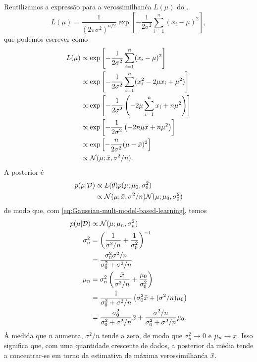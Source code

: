 \begin{solution}
    Reutilizamos a express\~ao para a verossimilhan\'ca $L(\mu)$ do .
    \begin{equation}
        L(\mu) = \frac{1}{(2\pi\sigma^2)^{n/2}}\exp\left[-\frac{1}{2\sigma^2}\sum_{i=1}^n (x_i-\mu)^2\right],
    \end{equation}
    que podemos escrever como
    \begin{align}
        L(\mu) & \propto \exp\left[-\frac{1}{2\sigma^2}\sum_{i=1}^n (x_i-\mu)^2\right]\\
        & \propto  \exp\left[-\frac{1}{2\sigma^2}\sum_{i=1}^n (x_i^2-2\mu x_i + \mu^2)\right]\\
        & \propto  \exp\left[-\frac{1}{2\sigma^2}\left( -2 \mu \sum_{i=1}^n x_i + n \mu^2 \right)\right]\\
        & \propto  \exp\left[-\frac{1}{2\sigma^2}\left( -2n \mu \bar{x} + n \mu^2 \right)\right]\\
        & \propto  \exp\left[-\frac{n}{2\sigma^2}(\mu-\bar{x})^2 \right]\\
        & \propto  \mathcal{N}(\mu ; \bar{x}, \sigma^2/n).
    \end{align}
    A posterior \'e
    \begin{align}
        p(\mu | \mathcal{D}) & \propto L(\theta) p(\mu; \mu_0, \sigma_0^2)\\
        & \propto  \mathcal{N}(\mu ; \bar{x}, \sigma^2/n)  \mathcal{N}(\mu ; \mu_0, \sigma_0^2)
    \end{align}
    de modo que, com \eqref{eq:Gaussian-mult-model-based-learning}, temos
    \begin{align}
        p(\mu | \mathcal{D}) & \propto \mathcal{N}(\mu ; \mu_n, \sigma_n^2)\\
        \sigma^2_n & =  \left( \frac{1}{\sigma^2/n} + \frac{1}{\sigma_0^2}\right)^{-1} \\
        & =  \frac{ \sigma_0^2 \sigma^2/n}{\sigma_0^2+\sigma^2/n}\\
        \mu_n & =  \sigma_n^2\left( \frac{\bar{x}}{\sigma^2/n}+ \frac{\mu_0}{\sigma_0^2}\right)\\
        & = \frac{1}{\sigma_0^2+\sigma^2/n}\left(\sigma_0^2 \bar{x} + (\sigma^2/n) \mu_0\right)\\
        & = \frac{\sigma_0^2}{\sigma_0^2+\sigma^2/n} \bar{x} + \frac{\sigma^2/n} {\sigma_0^2+\sigma^2/n} \mu_0.
    \end{align}
    \`A medida que $n$ aumenta, $\sigma^2/n$ tende a zero, de modo que $\sigma_n^2 \to 0$
    e $\mu_n \to \bar{x}$. Isso significa que, com uma quantidade crescente de
    dados, a posterior da m\'edia tende a concentrar-se em torno da
    estimativa de m\'axima verossimilhan\'ca $\bar{x}$.
    

\end{solution}
